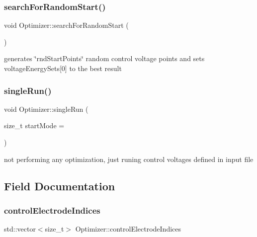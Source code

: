 \subsubsection{\texorpdfstring{search\+For\+Random\+Start()}{searchForRandomStart()}}
{\footnotesize\ttfamily void Optimizer\+::search\+For\+Random\+Start (\begin{DoxyParamCaption}{ }\end{DoxyParamCaption})\hspace{0.3cm}{\ttfamily [private]}}

generates \char`\"{}rnd\+Start\+Points\char`\"{} random control voltage points and sets voltage\+Energy\+Sets\mbox{[}0\mbox{]} to the best result \mbox{\label{classOptimizer_aff5efd6e481349d870e12221ce865a25}} 
\subsubsection{\texorpdfstring{single\+Run()}{singleRun()}}
{\footnotesize\ttfamily void Optimizer\+::single\+Run (\begin{DoxyParamCaption}\item[{size\+\_\+t}]{start\+Mode = {} }\end{DoxyParamCaption})\hspace{0.3cm}{\ttfamily [private]}}

not performing any optimization, just runing control voltages defined in input file 

\subsection{Field Documentation}
\mbox{\label{classOptimizer_a0204c3a84115d2ca60ac03b1e08f6db2}} 
\subsubsection{\texorpdfstring{control\+Electrode\+Indices}{controlElectrodeIndices}}
{\footnotesize\ttfamily std\+::vector$<$size\+\_\+t$>$ Optimizer\+::control\+Electrode\+Indices\hspace{0.3cm}{\ttfamily [private]}}

